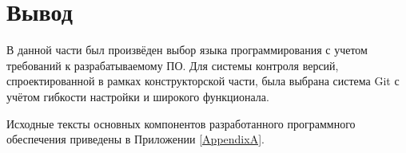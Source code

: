 \section{Вывод} \label{technologic_conclusion}

В данной части был произвёден выбор языка программирования с учетом требований к разрабатываемому ПО.
Для системы контроля версий, спроектированной в рамках конструкторской части, была выбрана система Git с учётом гибкости настройки и широкого функционала.

\vspace{\baselineskip}
Исходные тексты основных компонентов разработанного программного обеспечения приведены в Приложении \ref{AppendixA}.